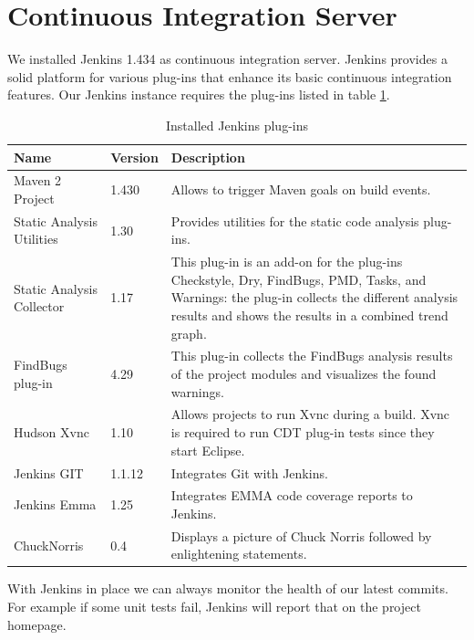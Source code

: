 \documentclass[11pt,a4paper,oneside]{scrreprt}
\begin{document}
\section{Continuous Integration Server}
We installed Jenkins 1.434 \cite{jenkinssetup} as continuous integration server. Jenkins provides a solid platform for various plug-ins that enhance its basic continuous integration features. Our Jenkins instance requires the plug-ins listed in table \ref{jenkins_plugins}.

\begin{table}[th]
\begin{center}
\begin{tabular}{|l|l|p{}|}
\hline
Name & Version & Description \\
\hline
Maven 2 Project & 1.430 & Allows to trigger Maven goals on build events. \\
Static Analysis Utilities & 1.30 & Provides utilities for the static code analysis plug-ins. \\
Static Analysis Collector & 1.17 & This plug-in is an add-on for the plug-ins Checkstyle, Dry, FindBugs, PMD, Tasks, and Warnings: the plug-in collects the different analysis results and shows the results in a combined trend graph.\\
FindBugs plug-in & 4.29 & This plug-in collects the FindBugs analysis results of the project modules and visualizes the found warnings. \\
Hudson Xvnc & 1.10 & Allows projects to run Xvnc during a build. Xvnc is required to run CDT plug-in tests since they start Eclipse. \\
Jenkins GIT &	1.1.12 & Integrates Git with Jenkins. \\
Jenkins Emma & 1.25 & Integrates EMMA code coverage reports to Jenkins.\\
ChuckNorris & 0.4 & Displays a picture of Chuck Norris followed by enlightening statements. \\
\hline
\end{tabular}
\caption{Installed Jenkins plug-ins}
\label{jenkins_plugins}
\end{center}
\end{table}

With Jenkins in place we can always monitor the health of our latest commits. For example if some unit tests fail, Jenkins will report that on the project homepage.
\end{document}
